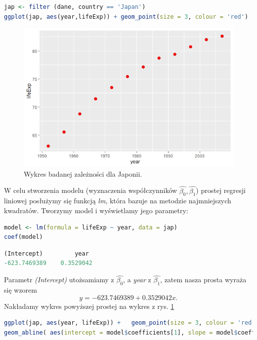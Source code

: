 \documentclass[a4paper]{article}
\begin{document}
\begin{lstlisting}[language=R,frame=single]
jap <- filter (dane, country == 'Japan')
ggplot(jap, aes(year,lifeExp)) + geom_point(size = 3, colour = 'red')
\end{lstlisting}
\begin{figure}[ht]
    \centering
    \includegraphics[width = 250 pt, height = 190 pt]{JAPONIA_PUNKTY.jpeg}
    \caption{Wykres badanej zależności dla Japonii.}
    \label{r(2.3)}
\end{figure}\newpage
W celu stworzenia modelu (wyznaczenia współczynników $\hat{\beta_0}, \hat{\beta_1}$) prostej regresji liniowej posłużymy się funkcją \textit{lm}, która bazuje na metodzie najmniejszych kwadratów. Tworzymy model i wyświetlamy jego parametry: 
\begin{lstlisting}[language=R, frame=single, ]
model <- lm(formula = lifeExp ~ year, data = jap)
coef(model)
\end{lstlisting}
\begin{lstlisting}[language=R, frame=single, ]
 (Intercept)         year 
-623.7469389    0.3529042 
\end{lstlisting}
Parametr \textit{(Intercept)} utożsamiamy z $\hat{\beta_0}$, a \textit{year} z $\hat{\beta_1}$, zatem nasza prosta wyraża się wzorem 
\begin{equation}
    y = -623.7469389 + 0.3529042x.
\end{equation}
Nakładamy wykres powyższej prostej na wykres z rys. \ref{r(2.3)}
\begin{lstlisting}[language=R, frame=single ]
ggplot(jap, aes(year, lifeExp)) +   geom_point(size = 3, colour = 'red') + 
geom_abline( aes(intercept = model$coefficients[1], slope = model$coefficients[2]), colour = 'blue', size = 1)
\end{lstlisting}
\end{document}
